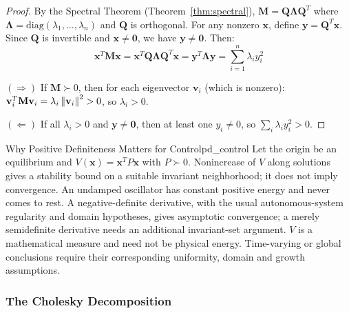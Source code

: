 \begin{proof}
By the Spectral Theorem (Theorem~\ref{thm:spectral}), $\mathbf{M} = \mathbf{Q}\boldsymbol{\Lambda}\mathbf{Q}^T$ where $\boldsymbol{\Lambda} = \text{diag}(\lambda_1, \ldots, \lambda_n)$ and $\mathbf{Q}$ is orthogonal. For any nonzero $\mathbf{x}$, define $\mathbf{y} = \mathbf{Q}^T \mathbf{x}$. Since $\mathbf{Q}$ is invertible and $\mathbf{x} \neq \mathbf{0}$, we have $\mathbf{y} \neq \mathbf{0}$. Then:
\begin{equation}
    \mathbf{x}^T \mathbf{M} \mathbf{x} = \mathbf{x}^T \mathbf{Q}\boldsymbol{\Lambda}\mathbf{Q}^T \mathbf{x} = \mathbf{y}^T \boldsymbol{\Lambda} \mathbf{y} = \sum_{i=1}^n \lambda_i y_i^2
\end{equation}

$(\Rightarrow)$ If $\mathbf{M} \succ 0$, then for each eigenvector $\mathbf{v}_i$ (which is nonzero): $\mathbf{v}_i^T \mathbf{M} \mathbf{v}_i = \lambda_i \left\lVert \mathbf{v}_i \right\rVert^2 > 0$, so $\lambda_i > 0$.

$(\Leftarrow)$ If all $\lambda_i > 0$ and $\mathbf{y} \neq \mathbf{0}$, then at least one $y_i \neq 0$, so $\sum_i \lambda_i y_i^2 > 0$.
\end{proof}

\begin{laymansbox}{Why Positive Definiteness Matters for Control}{pd_control}
Let the origin be an equilibrium and $V(\mathbf x)=\mathbf x^TP\mathbf x$ with $P\succ0$. Nonincrease of $V$ along solutions gives a stability bound on a suitable invariant neighborhood; it does not imply convergence. An undamped oscillator has constant positive energy and never comes to rest. A negative-definite derivative, with the usual autonomous-system regularity and domain hypotheses, gives asymptotic convergence; a merely semidefinite derivative needs an additional invariant-set argument. $V$ is a mathematical measure and need not be physical energy. Time-varying or global conclusions require their corresponding uniformity, domain and growth assumptions.

\end{laymansbox}

\subsubsection{The Cholesky Decomposition}


